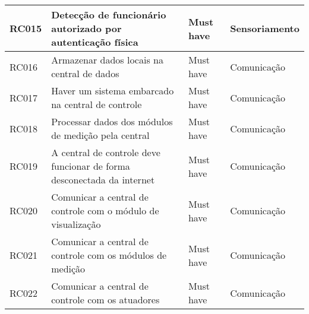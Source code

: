 \begin{table}[H]
\begin{adjustbox}{max width = \textwidth}
\begin{tabular}{|L{1.5cm}|L{8.5cm}|C{2.5cm}|C{3.5cm}|}
        RC015 & Detecção de funcionário autorizado por autenticação física & Must have & Sensoriamento \\ \hline
        RC016 & Armazenar dados locais na central de dados & Must have & Comunicação\\ \hline
        RC017 & Haver um sistema embarcado na central de controle & Must have & Comunicação\\ \hline
        RC018 & Processar dados dos módulos de medição  pela central & Must have & Comunicação\\ \hline
        RC019 & A central de controle deve funcionar de forma desconectada da internet & Must have & Comunicação\\ \hline
        RC020 & Comunicar a central de controle  com o módulo de visualização & Must have & Comunicação\\ \hline
        RC021 & Comunicar a central de controle com os módulos de medição & Must have & Comunicação\\ \hline
        RC022 & Comunicar a central de controle com os atuadores & Must have & Comunicação\\ \hline
        \end{tabular}
	\end{adjustbox}    
\end{table}


